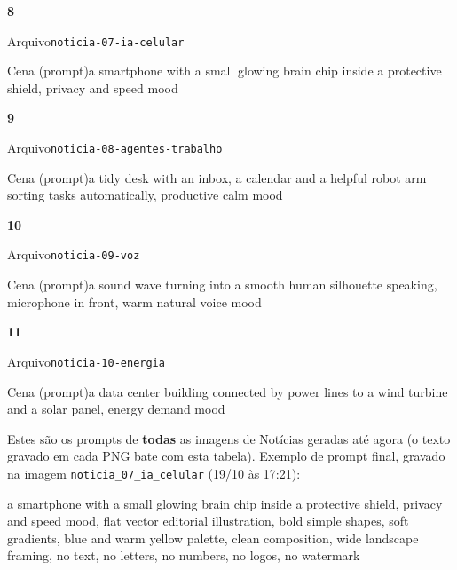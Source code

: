\begin{recordbox}
{\bfseries\color{accent} 8}\par
{\small\color{muted} Arquivo}\quad \nolinkurl{noticia-07-ia-celular}\par
{\small\color{muted} Cena (prompt)}\quad a smartphone with a small glowing brain chip inside a protective shield, privacy and speed mood\par
\end{recordbox}
\begin{recordbox}
{\bfseries\color{accent} 9}\par
{\small\color{muted} Arquivo}\quad \nolinkurl{noticia-08-agentes-trabalho}\par
{\small\color{muted} Cena (prompt)}\quad a tidy desk with an inbox, a calendar and a helpful robot arm sorting tasks automatically, productive calm mood\par
\end{recordbox}
\begin{recordbox}
{\bfseries\color{accent} 10}\par
{\small\color{muted} Arquivo}\quad \nolinkurl{noticia-09-voz}\par
{\small\color{muted} Cena (prompt)}\quad a sound wave turning into a smooth human silhouette speaking, microphone in front, warm natural voice mood\par
\end{recordbox}
\begin{recordbox}
{\bfseries\color{accent} 11}\par
{\small\color{muted} Arquivo}\quad \nolinkurl{noticia-10-energia}\par
{\small\color{muted} Cena (prompt)}\quad a data center building connected by power lines to a wind turbine and a solar panel, energy demand mood\par
\end{recordbox}


Estes são os prompts de \textbf{todas} as imagens de Notícias geradas até agora (o texto gravado em cada PNG bate com esta tabela). Exemplo de prompt final, gravado na imagem \nolinkurl{noticia_07_ia_celular} (19/10 às 17:21):

\begin{sourcequote}
a smartphone with a small glowing brain chip inside a protective shield, privacy and speed mood, flat vector editorial illustration, bold simple shapes, soft gradients, blue and warm yellow palette, clean composition, wide landscape framing, no text, no letters, no numbers, no logos, no watermark

\end{sourcequote}

